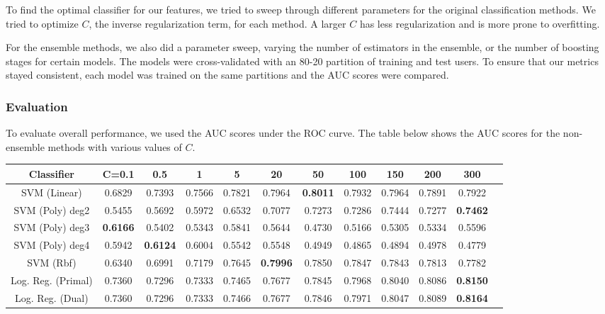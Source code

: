 \documentclass{article} %
\begin{document}
To find the optimal classifier for our features, we tried to sweep through different parameters for the original classification methods.
We tried to optimize $C$, the inverse regularization term, for each method.
A larger $C$ has less regularization and is more prone to overfitting.

For the ensemble methods, we also did a parameter sweep, varying the number of
estimators in the ensemble, or the number of boosting stages for certain models.
The models were cross-validated with an 80-20 partition of training and test
users. To ensure that our metrics stayed consistent, each model was trained on
the same partitions and the AUC scores were compared.

\subsubsection{Evaluation}

To evaluate overall performance, we used the AUC scores under the ROC curve.
The table below shows the AUC scores for the non-ensemble methods with various values of $C$.

\begin{adjustbox}{width=\textwidth,totalheight=\textheight,keepaspectratio}
\begin{tabular}{c|ccccccccccc}
Classifier & C=0.1 & 0.5 & 1 & 5 & 20 & 50 & 100 & 150 & 200 & 300\\
\hline
SVM (Linear) & 0.6829 & 0.7393 & 0.7566 & 0.7821 & 0.7964 & \textbf{0.8011} & 0.7932 & 0.7964 & 0.7891 & 0.7922\\
SVM (Poly) deg2 & 0.5455 & 0.5692 & 0.5972 & 0.6532 & 0.7077 & 0.7273 & 0.7286 & 0.7444 & 0.7277 & \textbf{0.7462}\\
SVM (Poly) deg3 & \textbf{0.6166} & 0.5402 & 0.5343 & 0.5841 & 0.5644 & 0.4730 & 0.5166 & 0.5305 & 0.5334 & 0.5596\\
SVM (Poly) deg4 & 0.5942 & \textbf{0.6124} & 0.6004 & 0.5542 & 0.5548 & 0.4949 & 0.4865 & 0.4894 & 0.4978 & 0.4779\\
SVM (Rbf) & 0.6340 & 0.6991 & 0.7179 & 0.7645 & \textbf{0.7996} & 0.7850 & 0.7847 & 0.7843 & 0.7813 & 0.7782\\
Log. Reg. (Primal) & 0.7360 & 0.7296 & 0.7333 & 0.7465 & 0.7677 & 0.7845 & 0.7968 & 0.8040 & 0.8086 & \textbf{0.8150}\\
Log. Reg. (Dual) & 0.7360 & 0.7296 & 0.7333 & 0.7466 & 0.7677 & 0.7846 & 0.7971 & 0.8047 & 0.8089 & \textbf{0.8164}\\
\end{tabular}
\end{adjustbox}
\end{document}
